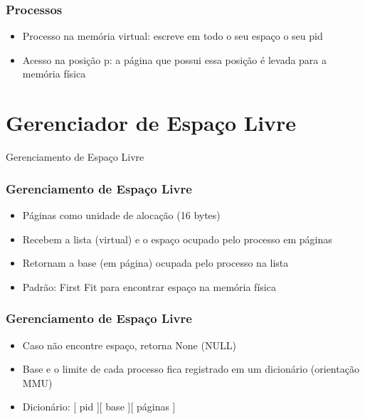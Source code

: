 \documentclass{beamer}
\begin{document}
\begin{frame}
\frametitle{Processos}

\begin{itemize}
\item Processo na memória virtual: escreve em todo o seu espaço o seu pid

\item Acesso na posição p: a página que possui essa posição é levada para a memória física
\end{itemize}
\justifying
\end{frame}


\section{Gerenciador de Espaço Livre} 
\begin{frame}
\begin{Large}
\begin{center}
Gerenciamento de Espaço Livre
\end{center}
\end{Large}
\end{frame}

\begin{frame}
\frametitle{Gerenciamento de Espaço Livre}
\begin{itemize}

\item Páginas como unidade de alocação (16 bytes)  

\item Recebem a lista (virtual) e o espaço ocupado pelo processo em páginas

\item Retornam a base (em página) ocupada pelo processo na lista

\item Padrão: First Fit para encontrar espaço na memória física

\end{itemize}
\end{frame}

\begin{frame}
\frametitle{Gerenciamento de Espaço Livre}
\begin{itemize}
\item Caso não encontre espaço, retorna None (NULL)

\item Base e o limite de cada processo fica registrado em um dicionário (orientação MMU) 

\item Dicionário: [ pid ][ base ][ páginas ]
\end{itemize}
\end{frame}
\end{document}
